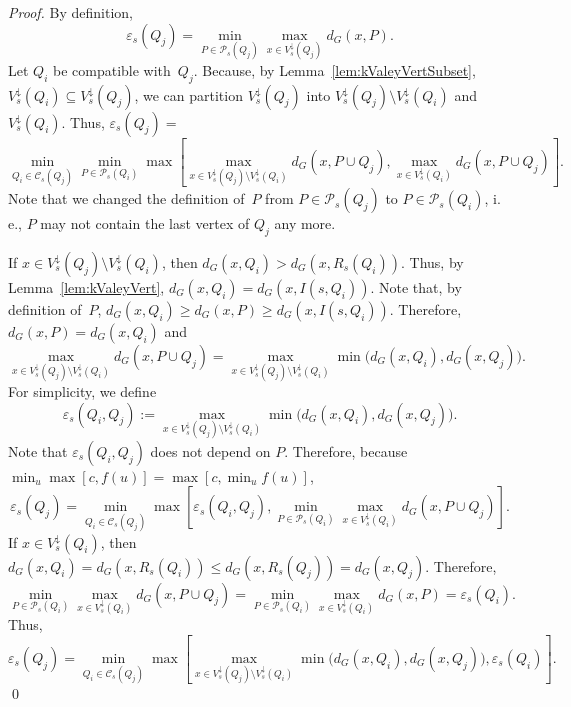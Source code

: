 \documentclass[10pt]{llncs}
\makeatletter
\newcommand{\calC}{\mathcal{C}}
\newcommand{\calP}{\mathcal{P}}
\newcommand{\ie}{i.\,e.\@ifnextchar{,}{}{~}}
\makeatother
\begin{document}
\begin{proof}
By definition,
\[
    \varepsilon_s(Q_j)
    =
    \min_{P \in \calP_s(Q_j)} \max_{x \in V^\downarrow_s(Q_j)} d_G(x, P).
\]
Let $Q_{i}$ be compatible with~$Q_j$.
Because, by Lemma~\ref{lem:kValeyVertSubset}, $V^\downarrow_s(Q_{i}) \subseteq V^\downarrow_s(Q_j)$, we can partition $V^\downarrow_s(Q_j)$ into $V^\downarrow_s(Q_j) \setminus V^\downarrow_s(Q_{i})$ and $V^\downarrow_s(Q_{i})$.
Thus, $\varepsilon_s(Q_j) =$
\[
    \min_{Q_{i} \in \calC_s(Q_j)} \min_{P \in \calP_s(Q_{i})} \max \left[
        \max_{x \in V^\downarrow_s(Q_j) \setminus V^\downarrow_s(Q_{i})} d_G(x, P \cup Q_j),
        \max_{x \in V^\downarrow_s(Q_{i})} d_G(x, P \cup Q_j)
    \right].
\]
Note that we changed the definition of~$P$ from $P \in \calP_s(Q_j)$ to $P \in \calP_s(Q_{i})$, \ie, $P$ may not contain the last vertex of $Q_j$ any more.

If $x \in V^\downarrow_s(Q_j) \setminus V^\downarrow_s(Q_{i})$, then $d_G(x, Q_{i}) > d_G(x, R_s(Q_{i}))$.
Thus, by Lemma~\ref{lem:kValeyVert}, $d_G(x, Q_{i}) = d_G(x, I(s, Q_{i}))$.
Note that, by definition of~$P$, $d_G(x, Q_i) \geq d_G(x, P) \geq d_G(x, I(s,Q_i))$.
Therefore, $d_G(x, P) = d_G(x, Q_i)$ and
\[
    \max_{x \in V^\downarrow_s(Q_j) \setminus V^\downarrow_s(Q_{i})} d_G(x, P \cup Q_j)
    =
    \max_{x \in V^\downarrow_s(Q_j) \setminus V^\downarrow_s(Q_{i})} \min \big( d_G(x, Q_{i}), d_G(x, Q_{j}) \big).
\]
For simplicity, we define
\[
    \varepsilon_s(Q_i, Q_j)
    :=
    \max_{x \in V^\downarrow_s(Q_j) \setminus V^\downarrow_s(Q_{i})} \min \big( d_G(x, Q_{i}), d_G(x, Q_{j}) \big).
\]
Note that $\varepsilon_s(Q_i, Q_j)$ does not depend on $P$.
Therefore, because $\min_{u} \max [ c, f(u) ] = \max [ c, \min_{u} f(u) ]$,
\[
    \varepsilon_s(Q_j)
    =
    \min_{Q_{i} \in \calC_s(Q_j)} \max \left[
        \varepsilon_s(Q_i, Q_j),
        \min_{P \in \calP_s(Q_{i})} \max_{x \in V^\downarrow_s(Q_{i})} d_G(x, P \cup Q_j)
    \right].
\]
If $x \in V^\downarrow_s(Q_{i})$, then $d_G(x, Q_{i}) = d_G(x, R_s(Q_{i})) \leq d_G(x, R_s(Q_j)) = d_G(x, Q_j)$.
Therefore,
\[
    \min_{P \in \calP_s(Q_{i})} \max_{x \in V^\downarrow_s(Q_{i})} d_G(x, P \cup Q_j)
    =
    \min_{P \in \calP_s(Q_{i})} \max_{x \in V^\downarrow_s(Q_{i})} d_G(x, P)
    =
    \varepsilon_s(Q_{i}).
\]
Thus,
\[
    \varepsilon_s(Q_j)
    =
    \min_{Q_{i} \in \calC_s(Q_j)} \max \left[
        \max_{x \in V^\downarrow_s(Q_j) \setminus V^\downarrow_s(Q_{i})} \min \big( d_G(x, Q_{i}), d_G(x, Q_{j}) \big),
        \varepsilon_s(Q_{i})
    \right].
\]
\qed
\end{proof}
\end{document}
